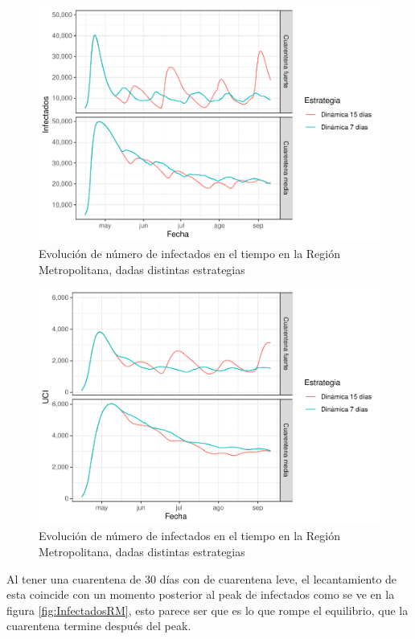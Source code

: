 \documentclass[]{article}
\begin{document}
\begin{figure}
\centering
\includegraphics{Informe_Mesa_2020_04_16_files/figure-latex/InfectadosRMDin-1.pdf}
\caption{\label{fig:InfectadosRMDin}Evolución de número de infectados en el tiempo en la Región Metropolitana, dadas distintas estrategias}
\end{figure}

\begin{figure}
\centering
\includegraphics{Informe_Mesa_2020_04_16_files/figure-latex/UCIRMDin-1.pdf}
\caption{\label{fig:UCIRMDin}Evolución de número de infectados en el tiempo en la Región Metropolitana, dadas distintas estrategias}
\end{figure}

Al tener una cuarentena de 30 días con de cuarentena leve, el lecantamiento de esta coincide con un momento posterior al peak de infectados como se ve en la figura \ref{fig:InfectadosRM}, esto parece ser que es lo que rompe el equilibrio, que la cuarentena termine después del peak.
\end{document}
